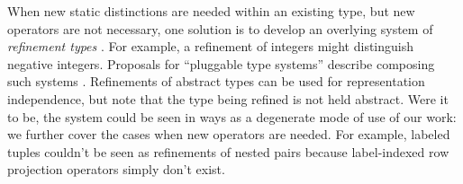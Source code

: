 \documentclass[preprint]{sigplanconf}
\begin{document}


When new static distinctions are needed within an existing type, but new operators are not necessary, one solution is to develop an overlying system of \emph{refinement types} \cite{Freeman91}. For example, a refinement of  integers might distinguish negative integers. Proposals for ``pluggable type systems'' describe composing such   systems \cite{Brac04a,Andreae:2006:FIP:1167473.1167479}. Refinements of abstract types can be used for representation independence, but note that the type being refined is not held abstract. %
Were it to be, the system could be seen in ways as a degenerate mode of use of our work: we further cover the cases when new  operators are needed. 
For example, labeled tuples couldn't be seen as refinements of nested pairs because label-indexed row projection operators simply don't exist. %
\end{document}
